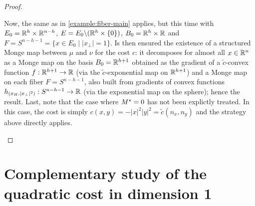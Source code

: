 \begin{proof}
\begin{enumerate}[label=(\roman*)]
                Now, the same as in \cref{example:fiber-main} applies, but this time with $E_0 = \mathbb{R}^h\times\mathbb{R}^{n-h}$, $E = E_0\backslash (\mathbb{R}^h\times\{0\})$, $B_0 = \mathbb{R}^h\times\mathbb{R}$ and $F = S^{n-h-1} = \{x \in E_0\mid |x_\perp|=1\}$. Is then ensured the existence of a structured Monge map between $\mu$ and $\nu$ for the cost $c$: it decomposes for almost all $x \in \mathbb{R}^n$ as a Monge map on the basis $B_0 = \mathbb{R}^{h+1}$ obtained as the gradient of a $\tilde c$-convex function $f:\mathbb{R}^{h+1}\to\mathbb{R}$ (via the $\tilde c$-exponential map on $\mathbb{R}^{h+1}$) and a Monge map on each fiber $F = S^{n-h-1}$, also built from gradients of convex functions $h_{(x_H,|x_\perp|^2)}:S^{n-h-1}\to\mathbb{R}$ (via the exponential map on the sphere); hence the result.
                Last, note that the case where $M^\star = 0$ has not been explictly treated. In this case, the cost is simply $c(x,y)=-|x|^2|y|^2=\tilde c(n_x,n_y)$ and the strategy above directly applies.\qedhere
            \end{enumerate}
            \end{proof}


            \section{Complementary study of the quadratic cost in dimension 1}
            \label{subsec:quadra1D}

